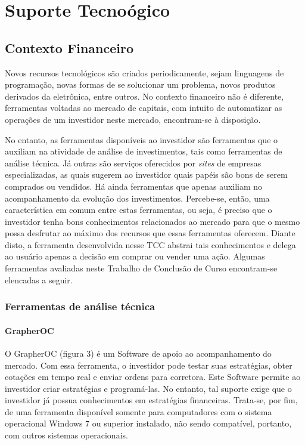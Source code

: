 \chapter[SUPORTE TECNOLÓGICO]{Suporte Tecnoógico}
\section{Contexto Financeiro}

Novos recursos tecnológicos são criados periodicamente, sejam linguagens de programação, novas formas de se solucionar um problema, novos produtos derivados da eletrônica, entre outros. No contexto financeiro não é diferente, ferramentas voltadas ao mercado de capitais, com intuito de automatizar as operações de um investidor neste mercado, encontram-se à disposição.

No entanto, as ferramentas disponíveis ao investidor são ferramentas que o auxiliam na atividade de análise de investimentos, tais como ferramentas de análise técnica. Já outras são serviços oferecidos por \textit{sites} de empresas especializadas, as quais sugerem ao investidor quais papéis são bons de serem comprados ou vendidos. Há ainda ferramentas que apenas auxiliam no acompanhamento da evolução dos investimentos. Percebe-se, então, uma característica em comum entre estas ferramentas, ou seja, é preciso que o investidor tenha bons conhecimentos relacionados ao mercado para que o mesmo possa desfrutar ao máximo dos recursos que essas ferramentas oferecem. Diante disto, a ferramenta desenvolvida nesse TCC abstrai tais conhecimentos e delega ao usuário apenas a decisão em comprar ou vender uma ação. Algumas ferramentas avaliadas neste Trabalho de Conclusão de Curso encontram-se elencadas a seguir.

\subsection{Ferramentas de análise técnica}

\subsubsection{GrapherOC}

O GrapherOC (figura 3) é um Software de apoio ao acompanhamento do mercado. Com essa ferramenta, o investidor pode testar suas estratégias, obter cotações em tempo real e enviar ordens para corretora. Este Software permite ao investidor criar estratégias e programá-las. No entanto, tal suporte exige que o investidor já possua conhecimentos em estratégias financeiras. Trata-se, por fim, de uma ferramenta disponível somente para computadores com o sistema operacional Windows 7 \textregistered   ou superior instalado, não sendo compatível, portanto, com outros sistemas operacionais.


